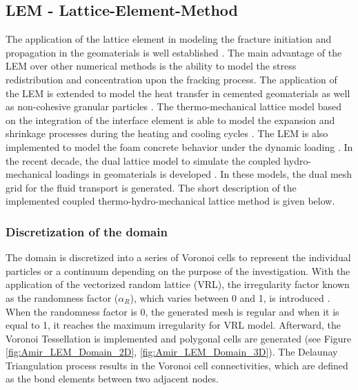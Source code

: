 \subsection{LEM - Lattice-Element-Method}

The application of the lattice element in modeling the fracture initiation and propagation in the geomaterials is well established \cite{Liuetal2007, Pradoetal2003, Vanmieretal2002}. The main advantage of the LEM over other numerical methods is the ability to model the stress redistribution and concentration upon the fracking process. The application of the LEM is extended to model the heat transfer in cemented geomaterials \cite{Sattarietal2017} as well as non-cohesive granular particles \cite{Rizvietal2018b}. The thermo-mechanical lattice model based on the integration of the interface element is able to model the expansion and shrinkage processes during the heating and cooling cycles \cite{Sattarietal2019b}. The LEM is also implemented to model the foam concrete behavior under the dynamic loading \cite{Rizvietal2018a}. In the recent decade, the dual lattice model to simulate the coupled hydro-mechanical loadings in geomaterials is developed \cite{Grassl2009}. In these models, the dual mesh grid for the fluid transport is generated. The short description of the implemented coupled thermo-hydro-mechanical lattice method is given below.

\subsubsection*{Discretization of the domain}
\label{Section:DiscretizationLattice}

The domain is discretized into a series of Voronoi cells to represent the individual particles or a continuum depending on the purpose of the investigation. With the application of the vectorized random lattice (VRL), the irregularity factor known as the randomness factor ($\alpha_{R}$), which varies between 0 and 1, is introduced \cite{Moukarzeletal1992}. When the randomness factor is 0, the generated mesh is regular and when it is equal to 1, it reaches the maximum irregularity for VRL model.  Afterward, the Voronoi Tessellation is implemented and polygonal cells are generated (see Figure \ref{fig:Amir_LEM_Domain_2D}, \ref{fig:Amir_LEM_Domain_3D}). The Delaunay Triangulation process results in the Voronoi cell connectivities, which are defined as the bond elements between two adjacent nodes. 

